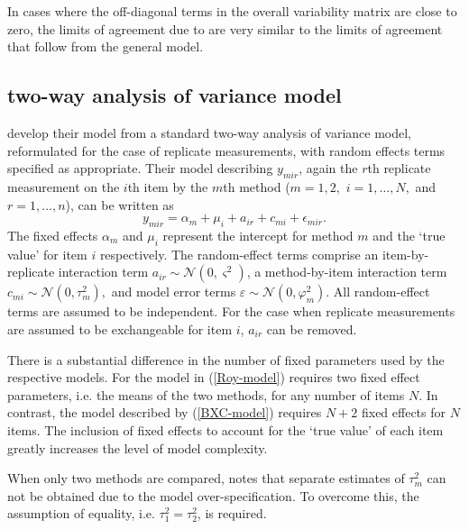 \documentclass[12pt, a4paper]{report}
\theoremstyle{plain}
\theoremstyle{definition}
\theoremstyle{remark}
\begin{document}
In cases where the off-diagonal terms in the overall variability
matrix are close to zero, the limits of agreement due to
\citet{bxc2008} are very similar to the limits of agreement that
follow from the general model.


\subsection{two-way analysis of variance model}

\citet{BXC2008} develop their model from a standard two-way analysis of variance model, reformulated for the case of replicate measurements, with random effects terms specified as appropriate. 
Their model describing $y_{mir} $, again the $r$th replicate measurement on the $i$th item by the $m$th method ($m=1,2,$ $i=1,\ldots,N,$ and $r = 1,\ldots,n$), can be written as
\begin{equation}\label{BXC-model}
y_{mir}  = \alpha_{m} + \mu_{i} + a_{ir} + c_{mi} + \epsilon_{mir}.
\end{equation}
The fixed effects $\alpha_{m}$ and $\mu_{i}$  represent the intercept for method $m$ and the `true value' for item $i$ respectively. The random-effect terms comprise an item-by-replicate interaction term $a_{ir} \sim \mathcal{N}(0,\varsigma^{2})$, a method-by-item interaction term $c_{mi} \sim \mathcal{N}(0,\tau^{2}_{m}),$ and model error terms $\varepsilon \sim \mathcal{N}(0,\varphi^{2}_{m}).$ All random-effect terms are assumed to be independent.
For the case when replicate measurements are assumed to be exchangeable for item $i$, $a_{ir}$ can be removed.

There is a substantial difference in the number of fixed parameters used by the respective models. For the model in (\ref{Roy-model}) requires two fixed effect parameters, i.e. the means of the two methods, for any number of items $N$. In contrast, the model described by (\ref{BXC-model}) requires $N+2$ fixed effects for $N$ items. The inclusion of fixed effects to account for the `true value' of each item greatly increases the level of model complexity.

When only two methods are compared, \citet{BXC2008} notes that separate estimates of $\tau^2_m$ can not be obtained due to the model over-specification. To overcome this, the assumption of equality, i.e. $\tau^2_1 = \tau^2_2$, is required.
\newpage

\newpage
\end{document}
